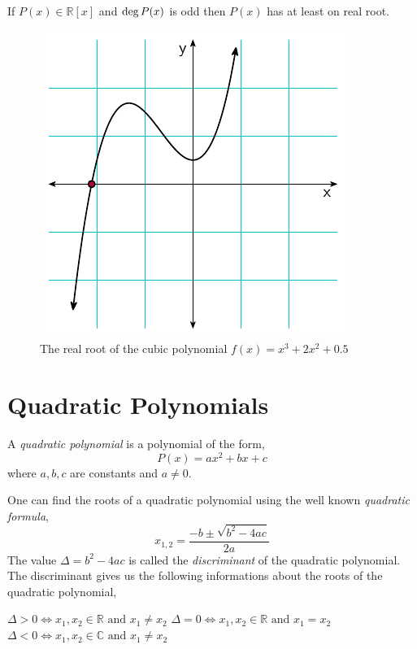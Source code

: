 \begin{corollary}
    If $P(x) \in \mathbb{R}[x]$ and $\operatorname{deg} P(x)$ is odd then $P(x)$ has at least on real root.
\end{corollary}

\begin{figure}[H]
\centering
\includegraphics[scale=1]{polynomials/figures/cubic_with_one_real_root}
\caption{The real root of the cubic polynomial $f(x)=x^3+2x^2+0.5$}
\end{figure}

\section{Quadratic Polynomials}
\begin{definition}
    A \textit{quadratic polynomial} is a polynomial of the form,
    \[
        P(x) = ax^{2} + bx + c
    \]
    where $a,b,c$ are constants and $a\neq 0$.
\end{definition}
One can find the roots of a quadratic polynomial using the well known \textit{quadratic formula},
\[
    x_{1,2} = \frac{-b \pm \sqrt{b^{2} - 4ac}}{2a}
\]
The value $\Delta = b^{2} - 4ac$ is called the \textit{discriminant} of the quadratic polynomial. 
The discriminant gives us the following informations about the roots of the quadratic polynomial,
\begin{itemize}
        \ii $\Delta>0 \iff x_{1}, x_{2} \in \mathbb{R} \text{ and } x_{1}\neq x_{2}$
        \ii $\Delta=0 \iff x_{1}, x_{2} \in \mathbb{R} \text{ and } x_{1}=x_{2}$
        \ii $\Delta<0 \iff x_{1}, x_{2} \in \mathbb{C} \text{ and } x_{1}\neq x_{2}$
\end{itemize}


